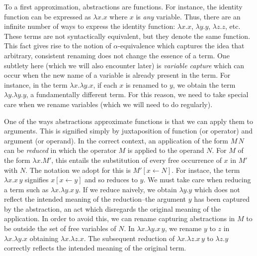 \documentclass[ms,electronic,twosidetoc,letterpaper,chaptercenter,parttop]{byumsphd}
\begin{document}
To a first approximation, abstractions are functions. For instance, the identity function
can be expressed as $\lambda x.x$ where $x$ is \emph{any} variable. Thus, there are an
infinite number of ways to express the identity function: $\lambda x.x$, $\lambda y.y$,
$\lambda z.z$, etc. These terms are not syntactically equivalent, but they denote the same
function. This fact gives rise to the notion of $\alpha$-equivalence which captures the
idea that arbitrary, consistent renaming does not change the essence of a term. One
subtlety here (which we will also encounter later) is \emph{variable capture} which can
occur when the new name of a variable is already present in the term. For instance, in the
term $\lambda x.\lambda y.x$, if each $x$ is renamed to $y$, we obtain the term $\lambda
y.\lambda y.y$, a fundamentally different term. For this reason, we need to take special 
care when we rename variables (which we will need to do regularly).

One of the ways abstractions approximate functions is that we can apply them to arguments.
This is signified simply by juxtaposition of function (or operator) and argument (or
operand). In the correct context, an application of the form $M\,N$ can be \emph{reduced}
in which the operator $M$ is applied to the operand $N$. For $M$ of the form $\lambda x.M'$, 
this entails the substitution of every free occurrence of $x$ in $M'$ with $N$. The notation 
we adopt for this is $M'[x\leftarrow N]$. For instace, the term $\lambda x.x\,y$ signifies 
$x[x\leftarrow y]$ and so reduces to $y$. We must take care when reducing a term such as 
$\lambda x.\lambda y.x\,y$. If we reduce naively, we obtain $\lambda y.y$ which does not 
reflect the intended meaning of the reduction--the argument $y$ has been captured by the 
abstraction, an act which disregards the original meaning of the application. In order to 
avoid this, we can rename capturing abstractions in $M$ to be outside the set of free 
variables of $N$. In $\lambda x.\lambda y.x\,y$, we rename $y$ to $z$ in $\lambda x.\lambda 
y.x$ obtaining $\lambda x.\lambda z.x$. The subsequent reduction of $\lambda x.\lambda 
z.x\,y$ to $\lambda z.y$ correctly reflects the intended meaning of the original term.
\end{document}
